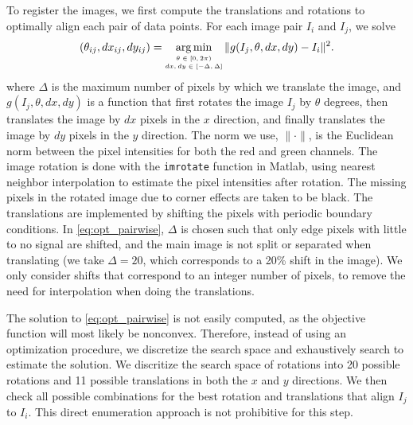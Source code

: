 \documentclass{pnastwo}
\DeclareMathOperator*{\argmin}{arg\,min}
\begin{document}
\begin{article}
\begin{materials}
To register the images, we first compute the translations and rotations to optimally align each pair of data points. 
%
For each image pair $I_i$ and $I_j$, we solve
\begin{equation}\label{eq:opt_pairwise}
(\theta_{ij}, dx_{ij}, dy_{ij}) = \argmin_{
\scriptsize \begin{matrix}
\theta \in [0, 2\pi) \\ 
dx, dy \in [-\Delta, \Delta]\\ 
\end{matrix}
} \|g(I_j, \theta, dx, dy) - I_i \|^2.
\end{equation}
where $\Delta$ is the maximum number of pixels by which we translate the image, and $g(I_j, \theta, dx, dy)$ is a function that first rotates the image $I_j$ by $\theta$ degrees, then translates the image by $dx$ pixels in the $x$ direction, and finally translates the image by $dy$ pixels in the $y$ direction. 
%
The norm we use, $\| \cdot \|$, is the Euclidean norm between the pixel intensities for both the red and green channels.
%
The image rotation is done with the \texttt{imrotate} function in Matlab, using nearest neighbor interpolation to estimate the pixel intensities after rotation.%
%
The missing pixels in the rotated image due to corner effects are taken to be black.
%
The translations are implemented by shifting the pixels with periodic boundary conditions.
%
In \eqref{eq:opt_pairwise}, $\Delta$ is chosen such that only edge pixels with little to no signal are shifted, and the main image is not split or separated when translating (we take $\Delta=20$, which corresponds to a 20\% shift in the image).
%
We only consider shifts that correspond to an integer number of pixels, to remove the need for interpolation when doing the translations.  

The solution to \eqref{eq:opt_pairwise} is not easily computed, as the objective function will most likely be nonconvex.
%
Therefore, instead of using an optimization procedure, we discretize the search space and exhaustively search to estimate the solution.
%
We discritize the search space of rotations into 20 possible rotations %
and 11 possible translations in both the $x$ and $y$ directions. %
%
We then check all possible combinations for the best rotation and translations that align $I_j$ to $I_i$. 
%
This direct enumeration approach is not prohibitive for this step.
%
%
%


\end{materials}
\end{article}
\end{document}
